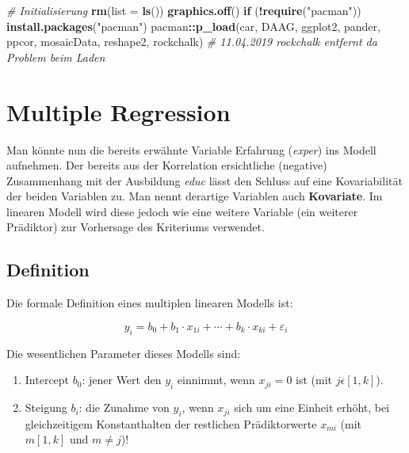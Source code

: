 \documentclass[]{article}
\newenvironment{Shaded}{\begin{snugshade}}{\end{snugshade}}
\newcommand{\CommentTok}[1]{\textcolor[rgb]{0.56,0.35,0.01}{\textit{#1}}}
\newcommand{\ControlFlowTok}[1]{\textcolor[rgb]{0.13,0.29,0.53}{\textbf{#1}}}
\newcommand{\DataTypeTok}[1]{\textcolor[rgb]{0.13,0.29,0.53}{#1}}
\newcommand{\KeywordTok}[1]{\textcolor[rgb]{0.13,0.29,0.53}{\textbf{#1}}}
\newcommand{\NormalTok}[1]{#1}
\newcommand{\OperatorTok}[1]{\textcolor[rgb]{0.81,0.36,0.00}{\textbf{#1}}}
\newcommand{\StringTok}[1]{\textcolor[rgb]{0.31,0.60,0.02}{#1}}
\providecommand{\tightlist}{%
  \setlength{\itemsep}{0pt}\setlength{\parskip}{0pt}}
\begin{document}
\begin{Shaded}
\begin{Highlighting}[]
  \CommentTok{# Initialisierung}
  \KeywordTok{rm}\NormalTok{(}\DataTypeTok{list =} \KeywordTok{ls}\NormalTok{())}
  \KeywordTok{graphics.off}\NormalTok{()}
  \ControlFlowTok{if}\NormalTok{ (}\OperatorTok{!}\KeywordTok{require}\NormalTok{(}\StringTok{"pacman"}\NormalTok{)) }\KeywordTok{install.packages}\NormalTok{(}\StringTok{"pacman"}\NormalTok{)}
\NormalTok{  pacman}\OperatorTok{::}\KeywordTok{p_load}\NormalTok{(car, DAAG, ggplot2, pander, ppcor, mosaicData, reshape2, rockchalk)}
  \CommentTok{# 11.04.2019 rockchalk entfernt da Problem beim Laden}
\end{Highlighting}
\end{Shaded}

\hypertarget{multiple-regression}{%
\section*{Multiple Regression}\label{multiple-regression}}

Man könnte nun die bereits erwähnte Variable Erfahrung (\emph{exper}) ins Modell aufnehmen. Der bereits aus der Korrelation ersichtliche (negative) Zusammenhang mit der Ausbildung \emph{educ} lässt den Schluss auf eine Kovariabilität der beiden Variablen zu. Man nennt derartige Variablen auch \textbf{Kovariate}. Im linearen Modell wird diese jedoch wie eine weitere Variable (ein weiterer Prädiktor) zur Vorhersage des Kriteriums verwendet.

\hypertarget{definition}{%
\subsection*{Definition}\label{definition}}

Die formale Definition eines multiplen linearen Modells ist:

\begin{equation} 
  y_i = b_0 + b_1 \cdot x_{1i} + \cdots + b_k \cdot x_{ki} + \varepsilon_i
  \label{eq:LinModMultFehler}
\end{equation}

Die wesentlichen Parameter dieses Modells sind:

\begin{enumerate}
\def\labelenumi{\arabic{enumi}.}
\tightlist
\item
  Intercept \(b_0\): jener Wert den \(y_i\) einnimmt, wenn \(x_{ji} = 0\) ist (mit \(j \epsilon [1,k]\)).
\item
  Steigung \(b_i\): die Zunahme von \(y_i\), wenn \(x_{ji}\) sich um eine Einheit erhöht, bei gleichzeitigem Konstanthalten der restlichen Prädiktorwerte \(x_{mi}\) (mit \(m [1,k]\) und \(m \ne j\))!
\end{enumerate}
\end{document}
